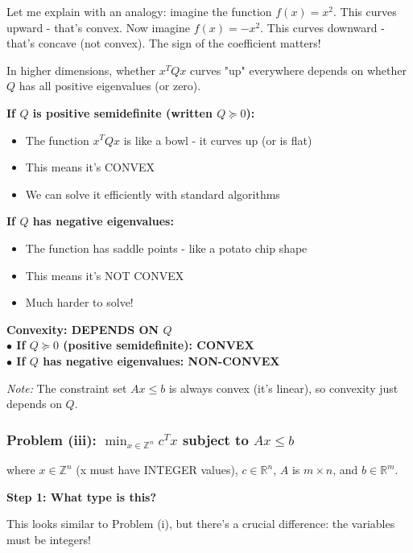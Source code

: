 \documentclass[11pt]{article}
\newenvironment{answerbox}
  {\begin{framed}\begin{center}\large\bfseries}
  {\end{center}\end{framed}}
\begin{document}
Let me explain with an analogy: imagine the function $f(x) = x^2$. This curves upward - that's convex. Now imagine $f(x) = -x^2$. This curves downward - that's concave (not convex). The sign of the coefficient matters!

In higher dimensions, whether $x^T Q x$ curves "up" everywhere depends on whether $Q$ has all positive eigenvalues (or zero).

\textbf{If $Q$ is positive semidefinite (written $Q \succeq 0$):}
\begin{itemize}
\item The function $x^T Q x$ is like a bowl - it curves up (or is flat)
\item This means it's CONVEX
\item We can solve it efficiently with standard algorithms
\end{itemize}

\textbf{If $Q$ has negative eigenvalues:}
\begin{itemize}
\item The function has saddle points - like a potato chip shape
\item This means it's NOT CONVEX
\item Much harder to solve!
\end{itemize}

\begin{answerbox}
\textbf{Convexity:} DEPENDS ON $Q$ \\
$\bullet$ If $Q \succeq 0$ (positive semidefinite): \textbf{CONVEX} \\
$\bullet$ If $Q$ has negative eigenvalues: \textbf{NON-CONVEX}
\end{answerbox}

\textit{Note:} The constraint set $Ax \leq b$ is always convex (it's linear), so convexity just depends on $Q$.

\vspace{1em}

\subsubsection{Problem (iii): $\min_{x \in \mathbb{Z}^n} c^T x$ subject to $Ax \leq b$}

where $x \in \mathbb{Z}^n$ (x must have INTEGER values), $c \in \mathbb{R}^n$, $A$ is $m \times n$, and $b \in \mathbb{R}^m$.

\textbf{Step 1: What type is this?}

This looks similar to Problem (i), but there's a crucial difference: the variables must be integers!
\end{document}

